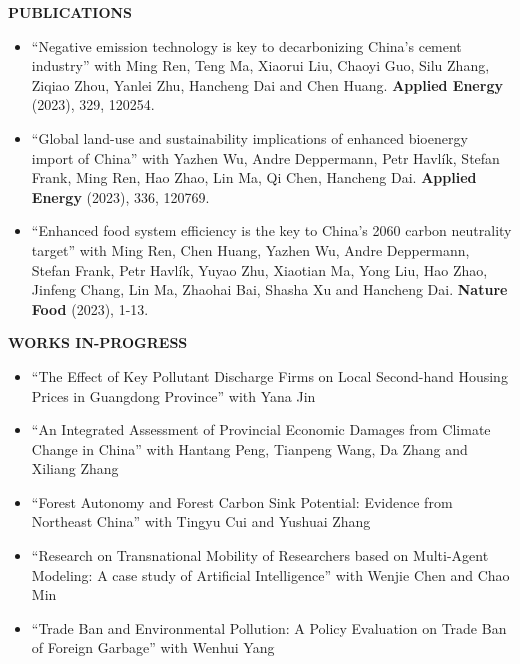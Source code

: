 \documentclass[UTF8]{ctexbook}
\begin{document}
\begin{center}
    \textbf{PUBLICATIONS}
\end{center}


\begin{itemize}
    \item ``Negative emission technology is key to decarbonizing China's cement industry'' with Ming Ren, Teng Ma, Xiaorui Liu, Chaoyi Guo, Silu Zhang, Ziqiao Zhou, Yanlei Zhu, Hancheng Dai and Chen Huang. \textbf{Applied Energy} (2023), 329, 120254.

    \item ``Global land-use and sustainability implications of enhanced bioenergy import of China'' with Yazhen Wu, Andre Deppermann, Petr Havlík, Stefan Frank, Ming Ren, Hao Zhao, Lin Ma, Qi Chen, Hancheng Dai. \textbf{Applied Energy} (2023), 336, 120769.

    \item ``Enhanced food system efficiency is the key to China's 2060 carbon neutrality target'' with Ming Ren, Chen Huang, Yazhen Wu, Andre Deppermann, Stefan Frank, Petr Havlík, Yuyao Zhu, Xiaotian Ma, Yong Liu, Hao Zhao, Jinfeng Chang, Lin Ma, Zhaohai Bai, Shasha Xu and Hancheng Dai. \textbf{Nature Food} (2023), 1-13.
\end{itemize}

\vspace{12pt}

\begin{center}
    \textbf{WORKS IN-PROGRESS}
\end{center}


\begin{itemize}
    \item ``The Effect of Key Pollutant Discharge Firms on Local Second-hand Housing Prices in Guangdong Province'' with Yana Jin
    \item ``An Integrated Assessment of Provincial Economic Damages from Climate Change in China'' with Hantang Peng, Tianpeng Wang, Da Zhang and Xiliang Zhang
    \item ``Forest Autonomy and Forest Carbon Sink Potential: Evidence from Northeast China'' with Tingyu Cui and Yushuai Zhang
    \item ``Research on Transnational Mobility of Researchers based on Multi-Agent Modeling: A case study of Artificial Intelligence'' with Wenjie Chen and Chao Min
    \item ``Trade Ban and Environmental Pollution: A Policy Evaluation on Trade Ban of Foreign Garbage'' with Wenhui Yang
\end{itemize}
\end{document}
